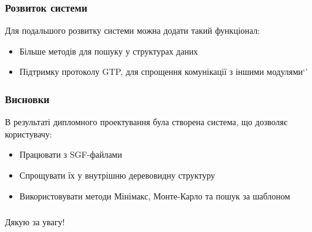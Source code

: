 \documentclass{beamer}
\begin{document}
\begin{frame}
    \frametitle{Розвиток системи}
    Для подальшого розвитку системи можна додати такий функціонал:
    \begin{itemize}
        \item Більше методів для пошуку у структурах даних
        \item Підтримку протоколу GTP, для спрощення комунікації з іншими модулями`'
    \end{itemize}
\end{frame}

\begin{frame}
    \frametitle{Висновки}
    В результаті дипломного проектування була створена система, що дозволяє користувачу:
    \begin{itemize}
        \item Працювати з SGF-файлами
        \item Спрощувати їх у внутрішню деревовидну структуру
        \item Використовувати методи Мінімакс, Монте-Карло та пошук за шаблоном
    \end{itemize}
\end{frame}

\begin{frame}
    \frametitle{}
    \hspace*{\fill}\huge{Дякую за увагу!}\hspace*{\fill}
\end{frame}
\end{document}
